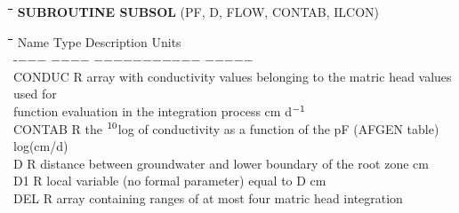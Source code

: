 \documentclass[11pt]{article}
\begin{document}
\bigskip
\bigskip
\bigskip
\nwln
\begin{tabbing}
\hspace{1.27cm}\=\hspace{1.27cm}\=\hspace{1.27cm}\=\hspace{1.27cm}\=%
\hspace{1.27cm}\=\hspace{1.27cm}\=\hspace{1.27cm}\=\hspace{1.27cm}\=%
\hspace{1.27cm}\=\hspace{1.27cm}\=\kill
{\bf SUBROUTINE SUBSOL} \> \> \> (PF, D, FLOW, CONTAB, ILCON)
\end{tabbing}
\nwln
\begin{tabbing}
\hspace{1.27cm}\=\hspace{1.27cm}\=\hspace{1.27cm}\=\hspace{1.27cm}\=%
\hspace{1.27cm}\=\hspace{1.27cm}\=\hspace{1.27cm}\=\hspace{1.27cm}\=%
\hspace{1.27cm}\=\hspace{1.27cm}\=\kill
Name    \> \> Type   \> Description                                        \> \> \> \> \> \> \> Units\\
-$-$$-$$-$    \> \> $-$$-$$-$$-$   \> $-$$-$$-$$-$$-$$-$$-$$-$$-$$-$$-$                                       \> \> \> \> \> \> \> $-$$-$$-$$-$$-$\\
CONDUC  \> \> R   \> array with conductivity values belonging to the matric head values used for \\
\>\> \> function evaluation in the integration process              \> \> \> \> \> \> \> cm d$^{{\rm -1}}$\\
CONTAB  \> \> R   \> the $^{{\rm 10}}$log of conductivity as a function of the pF (AFGEN table)    \> \> \> \> \> \> \> log(cm/d)\\
D       \> \> R   \> distance between groundwater and lower boundary of the root zone      \> \> \> \> \> \> \> cm\\
D1      \> \> R   \> local variable (no formal parameter) equal to D    \> \> \> \> \> \> \> cm\\
DEL     \> \> R   \> array containing ranges of at most four matric head integration \\
$$
\end{tabbing}
\end{document}
